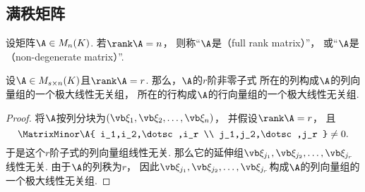 \subsection{满秩矩阵}
\begin{definition}
设矩阵\(\A \in M_n(K)\).
若\(\rank\A = n\)，
则称“\(\A\)是（full rank matrix）”，
或“\(\A\)是（non-degenerate matrix）”.
\end{definition}



\begin{corollary}
设\(\A\in M_{s \times n}(K)\)且\(\rank\A=r\).
那么，\(\A\)的\(r\)阶非零子式
所在的列构成\(\A\)的列向量组的一个极大线性无关组，
所在的行构成\(\A\)的行向量组的一个极大线性无关组.
\begin{proof}
将\(\A\)按列分块为\((\a_1,\a_2,\dotsc,\a_n)\)，
并假设\(\rank\A = r\)，
且\[
	\MatrixMinor\A{
		i_1,i_2,\dotsc,i_r \\
		j_1,j_2,\dotsc,j_r
	} \neq 0.
\]
于是这个\(r\)阶子式的列向量组线性无关.
那么它的延伸组\(\a_{j_1},\a_{j_2},\dotsc,\a_{j_r}\)线性无关.
由于\(\A\)的列秩为\(r\)，
因此\(\a_{j_1},\a_{j_2},\dotsc,\a_{j_r}\)构成\(\A\)的列向量组的一个极大线性无关组.
\end{proof}
\end{corollary}

